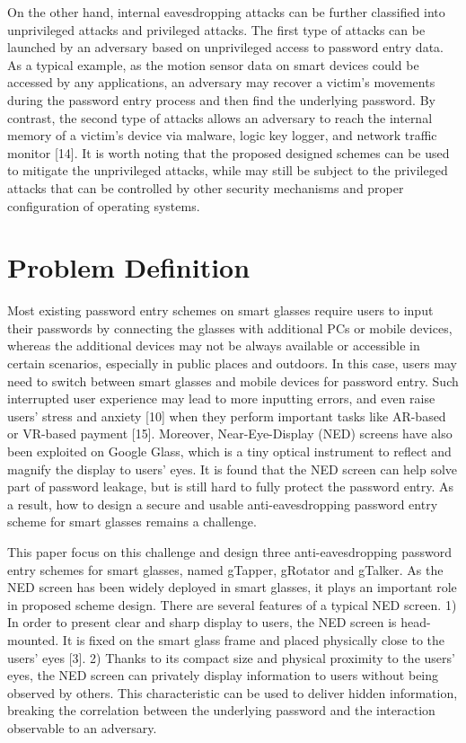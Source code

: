 \documentclass[12pt,a4paper,oneside]{report}
\begin{document}
\par 
On the other hand, internal eavesdropping attacks can
be further classified into unprivileged attacks and privileged
attacks. The first type of attacks can be launched by an
adversary based on unprivileged access to password entry data.
As a typical example, as the motion sensor data on smart
devices could be accessed by any applications, an adversary
may recover a victim’s movements during the password entry
process and then find the underlying password. By contrast, the second type of attacks allows an adversary to reach
the internal memory of a victim’s device via malware, logic
key logger, and network traffic monitor [14]. It is worth noting
that the proposed designed schemes can be used to mitigate the unprivileged attacks, while may still be subject to the privileged
attacks that can be controlled by other security mechanisms
and proper configuration of operating systems.




\section{Problem Definition}

Most existing password entry schemes on
smart glasses require users to input their passwords by connecting the glasses with additional PCs or mobile devices,
whereas the additional devices may not be always available or accessible in certain scenarios, especially in public
places and outdoors. In this case, users may need to switch
between smart glasses and mobile devices for password entry.
Such interrupted user experience may lead to more inputting
errors, and even raise users’ stress and anxiety [10] when
they perform important tasks like AR-based or VR-based
payment [15]. Moreover, Near-Eye-Display (NED) screens
have also been exploited on Google Glass, which is a tiny
optical instrument to reflect and magnify the display to users’
eyes. It is found that the NED screen can help solve
part of password leakage, but is still hard to fully protect the
password entry. As a result, how to design a secure and
usable anti-eavesdropping password entry scheme for smart
glasses remains a challenge.



\par
This paper focus on this challenge
and design three anti-eavesdropping password entry schemes
for smart glasses, named gTapper, gRotator and gTalker.
As the NED screen has been widely deployed in smart glasses,
it plays an important role in proposed scheme design. There are
several features of a typical NED screen. 1) In order to
present clear and sharp display to users, the NED screen
is head-mounted. It is fixed on the smart glass frame and
placed physically close to the users’ eyes [3]. 2) Thanks to
its compact size and physical proximity to the users’ eyes,
the NED screen can privately display information to users
without being observed by others. This characteristic can be
used to deliver hidden information, breaking the correlation
between the underlying password and the interaction observable to an adversary.
\end{document}

